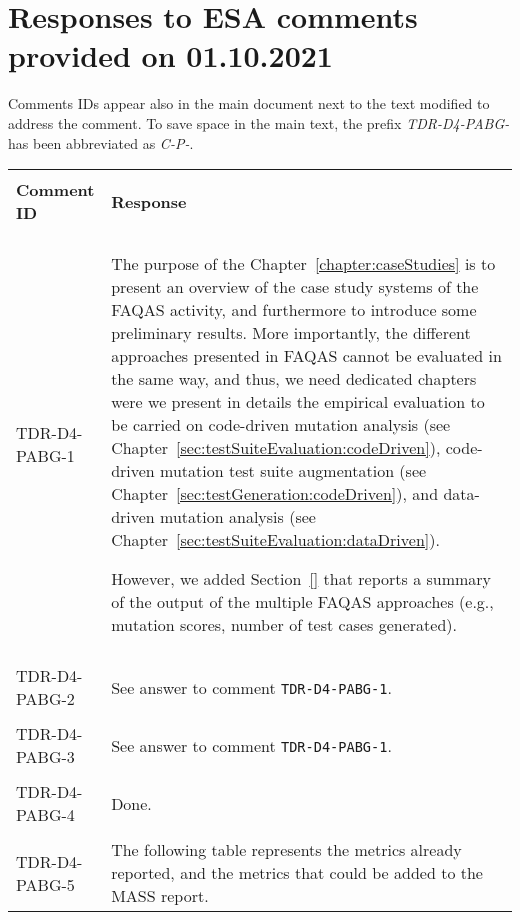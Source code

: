 
\section{Responses to ESA comments provided on 01.10.2021}
\label{sec:ESA:comments:1}

Comments IDs appear also in the main document next to the text modified to address the comment. To save space in the main text, the prefix \emph{TDR-D4-PABG-} has been abbreviated as \emph{C-P-}.

\setlength\LTleft{0pt}
\setlength\LTright{0pt}
\tiny 
\begin{longtable}{|p{2cm}|p{12cm}|@{}} 
\hline
\\
\textbf{Comment ID}&\textbf{Response}\\
\\
\hline
TDR-D4-PABG-1&
\begin{minipage}{12cm}
The purpose of the Chapter~\ref{chapter:caseStudies} is to present an overview of the case study systems of the FAQAS activity, and furthermore to introduce some preliminary results. More importantly, the different approaches presented in FAQAS cannot be evaluated in the same way, and thus, we need dedicated chapters were we present in details the empirical evaluation to be carried on code-driven mutation analysis (see Chapter~\ref{sec:testSuiteEvaluation:codeDriven}), code-driven mutation test suite augmentation (see Chapter~\ref{sec:testGeneration:codeDriven}), and data-driven mutation analysis (see Chapter~\ref{sec:testSuiteEvaluation:dataDriven}).

However, we added Section~\ref{} that reports a summary of the output of the multiple FAQAS approaches (e.g., mutation scores, number of test cases generated).
\end{minipage}\\
\\
\hline  
TDR-D4-PABG-2&
\begin{minipage}{12cm}
See answer to comment \texttt{TDR-D4-PABG-1}.
\end{minipage}\\
\\
\hline  
TDR-D4-PABG-3&
\begin{minipage}{12cm}
See answer to comment \texttt{TDR-D4-PABG-1}.
\end{minipage}\\
\\
\hline  
TDR-D4-PABG-4&
\begin{minipage}{12cm}
Done.
\end{minipage}\\
\\
\hline  
TDR-D4-PABG-5&
\begin{minipage}{12cm}
The following table represents the metrics already reported, and the metrics that could be added to the MASS report.


\end{minipage}
\end{longtable}
